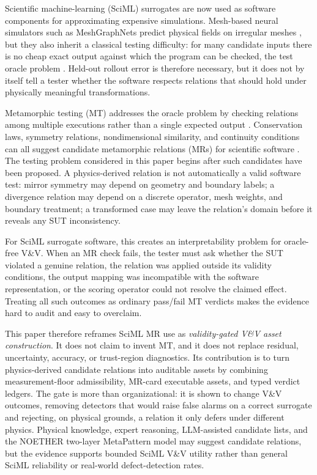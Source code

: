 \documentclass[preprint,12pt]{elsarticle}
\begin{document}
Scientific machine-learning (SciML) surrogates are now used as software components for approximating expensive simulations. Mesh-based neural simulators such as MeshGraphNets predict physical fields on irregular meshes \citep{pfaff2021meshgraphnets}, but they also inherit a classical testing difficulty: for many candidate inputs there is no cheap exact output against which the program can be checked, the test oracle problem \citep{barr2015oracle}. Held-out rollout error is therefore necessary, but it does not by itself tell a tester whether the software respects relations that should hold under physically meaningful transformations.

Metamorphic testing (MT) addresses the oracle problem by checking relations among multiple executions rather than a single expected output \citep{chen1998metamorphic,segura2016survey}. Conservation laws, symmetry relations, nondimensional similarity, and continuity conditions can all suggest candidate metamorphic relations (MRs) for scientific software \citep{kanewala2019scientific,lin2020exploratory,olsen2019simulation}. The testing problem considered in this paper begins after such candidates have been proposed. A physics-derived relation is not automatically a valid software test: mirror symmetry may depend on geometry and boundary labels; a divergence relation may depend on a discrete operator, mesh weights, and boundary treatment; a transformed case may leave the relation's domain before it reveals any SUT inconsistency.

For SciML surrogate software, this creates an interpretability problem for oracle-free V\&V. When an MR check fails, the tester must ask whether the SUT violated a genuine relation, the relation was applied outside its validity conditions, the output mapping was incompatible with the software representation, or the scoring operator could not resolve the claimed effect. Treating all such outcomes as ordinary pass/fail MT verdicts makes the evidence hard to audit and easy to overclaim.

This paper therefore reframes SciML MR use as \emph{validity-gated V\&V asset construction}. It does not claim to invent MT, and it does not replace residual, uncertainty, accuracy, or trust-region diagnostics. Its contribution is to turn physics-derived candidate relations into auditable assets by combining measurement-floor admissibility, MR-card executable assets, and typed verdict ledgers. The gate is more than organizational: it is shown to change V\&V outcomes, removing detectors that would raise false alarms on a correct surrogate and rejecting, on physical grounds, a relation it only defers under different physics. Physical knowledge, expert reasoning, LLM-assisted candidate lists, and the NOETHER two-layer MetaPattern model \citep{zhao2026noether} may suggest candidate relations, but the evidence supports bounded SciML V\&V utility rather than general SciML reliability or real-world defect-detection rates.
\end{document}
